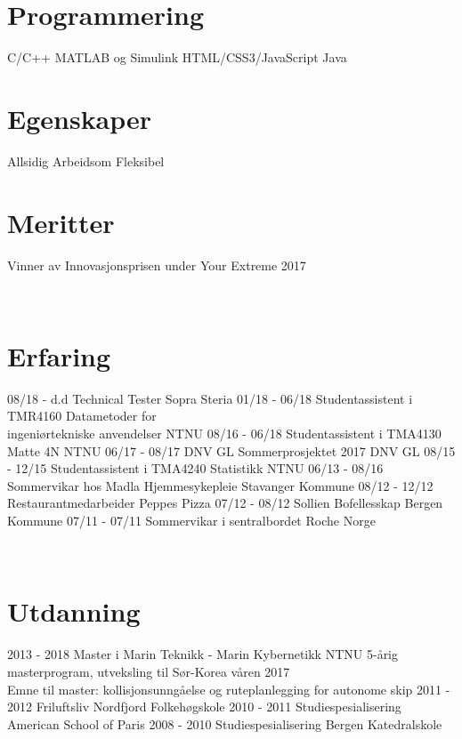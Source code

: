 \documentclass[]{friggeri-cv}
\begin{document}
\begin{aside}
  \section{Programmering}
       C/C++
       MATLAB og Simulink
       HTML/CSS3/JavaScript
       Java
    ~
  \section{Egenskaper}
    Allsidig
    Arbeidsom
    Fleksibel
    ~
  \section{Meritter}
    Vinner av Innovasjonsprisen under Your Extreme 2017 
\end{aside}
~
\vspace{5mm}
\section{Erfaring}
\begin{entrylist}
  \entry
    {08/18 - d.d}
    {Technical Tester}
    {Sopra Steria}
    {}
  \entry
    {01/18 - 06/18}
    {Studentassistent i TMR4160 Datametoder for \\ingeniørtekniske anvendelser}
    {NTNU}
    {}
  \entry
    {08/16 - 06/18}
    {Studentassistent i TMA4130 Matte 4N}
    {NTNU}
    {}
   \entry
    {06/17 - 08/17}
    {DNV GL Sommerprosjektet 2017}
    {DNV GL \vspace{1.5mm}}
    {%
    }
  \entry
    {08/15 - 12/15}
    {Studentassistent i TMA4240 Statistikk}
    {NTNU}
    {}
    \entry
    {06/13 - 08/16}
    {Sommervikar hos Madla Hjemmesykepleie}
    {Stavanger Kommune}
    {}
    \entry
    {08/12 - 12/12}
    {Restaurantmedarbeider}
    {Peppes Pizza}
    {}
    \entry
    {07/12 - 08/12}
    {Sollien Bofellesskap}
    {Bergen Kommune}
    {}
    \entry
    {07/11 - 07/11}
    {Sommervikar i sentralbordet}
    {Roche Norge}
    {}
\end{entrylist}
\\
\section{Utdanning}
\begin{entrylist}
  \entry
    {2013 - 2018}
    {Master i Marin Teknikk - Marin Kybernetikk}
    {NTNU}
    {5-årig masterprogram, utveksling til Sør-Korea våren 2017\\
    Emne til master: kollisjonsunngåelse og ruteplanlegging for autonome skip \vspace{3mm}}
  \entry
    {2011 - 2012}
    {Friluftsliv}
    {Nordfjord Folkehøgskole}
    {}
  \entry
    {2010 - 2011}
    {Studiespesialisering}
    {American School of Paris}
    {}
\entry
    {2008 - 2010}
    {Studiespesialisering}
    {Bergen Katedralskole}
    {}
\end{entrylist}
\end{document}
